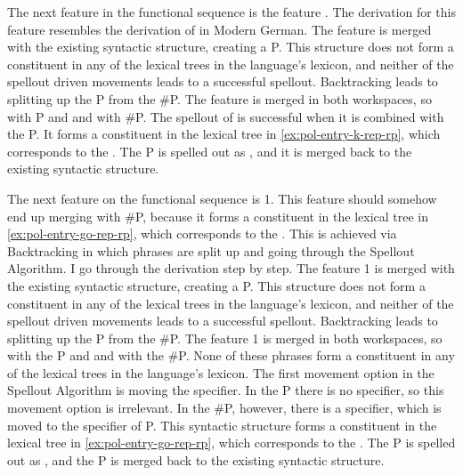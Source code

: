 The next feature in the functional sequence is the feature . The derivation for this feature resembles the derivation of  in Modern German.
The feature is merged with the existing syntactic structure, creating a P.
This structure does not form a constituent in any of the lexical trees in the language's lexicon, and neither of the spellout driven movements leads to a successful spellout.
Backtracking leads to splitting up the P from the \#P.
The feature  is merged in both workspaces, so with P and and with \#P. The spellout of  is successful when it is combined with the P.
It forms a constituent in the lexical tree in \ref{ex:pol-entry-k-rep-rp}, which corresponds to the .
The P is spelled out as , and it is merged back to the existing syntactic structure.

The next feature on the functional sequence is 1. This feature should somehow end up merging with \#P, because it forms a constituent in the lexical tree in \ref{ex:pol-entry-go-rep-rp}, which corresponds to the .
This is achieved via Backtracking in which phrases are split up and going through the Spellout Algorithm. I go through the derivation step by step.
The feature 1 is merged with the existing syntactic structure, creating a P.
This structure does not form a constituent in any of the lexical trees in the language's lexicon, and neither of the spellout driven movements leads to a successful spellout.
Backtracking leads to splitting up the P from the \#P.
The feature 1 is merged in both workspaces, so with the P and and with the \#P. None of these phrases form a constituent in any of the lexical trees in the language's lexicon.
The first movement option in the Spellout Algorithm is moving the specifier. In the P there is no specifier, so this movement option is irrelevant. In the \#P, however, there is a specifier, which is moved to the specifier of P.
This syntactic structure forms a constituent in the lexical tree in \ref{ex:pol-entry-go-rep-rp}, which corresponds to the .
The P is spelled out as , and the P is merged back to the existing syntactic structure.

